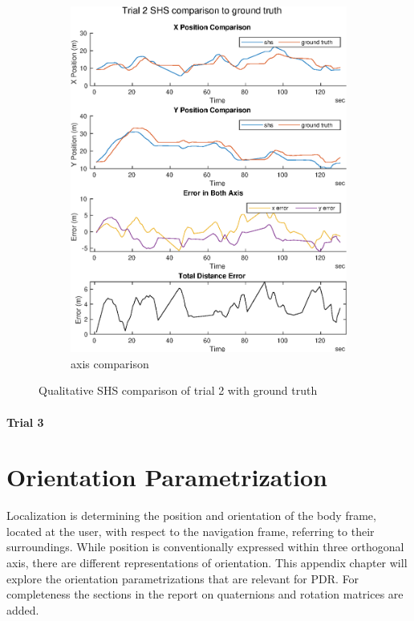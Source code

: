 \begin{figure}[H]
\begin{subfigure}[t]{.45\textwidth}
		\includegraphics[width=\linewidth]{images/20201029_1042_trial2_shs_2}
		\caption{axis comparison}
		\label{fig:trial2_comparison}
	\end{subfigure}
\setlength{\belowcaptionskip}{-20pt}
	\caption{Qualitative SHS comparison of trial 2 with ground truth}
	\label{fig:trial2_shs_gt_comparison}
\end{figure}

\subsubsection{Trial 3}

\chapter{Orientation Parametrization} \label{appen:orientparam}

Localization is determining the position and orientation of the body frame, located at the user, with respect to the navigation frame, referring to their surroundings. While position is conventionally expressed within three orthogonal axis, there are different representations of orientation. This appendix chapter will explore the orientation parametrizations that are relevant for \ac{PDR}. For completeness the sections in the report on quaternions and rotation matrices are added.

